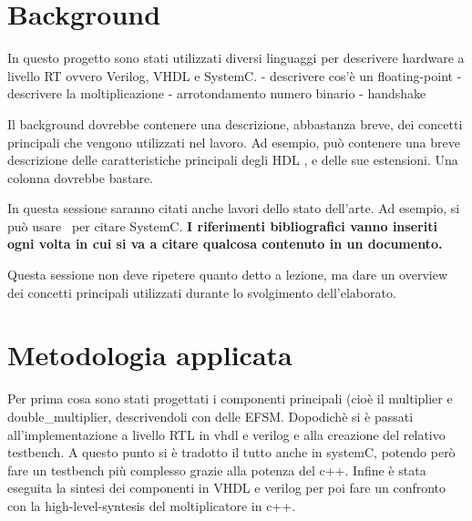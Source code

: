 \documentclass[]{IEEEtran}
\begin{document}
\section{Background}
In questo progetto sono stati utilizzati diversi linguaggi per descrivere hardware a livello RT ovvero Verilog, VHDL e SystemC.
- descrivere cos'è un floating-point
- descrivere la moltiplicazione
- arrotondamento numero binario
- handshake

Il background dovrebbe contenere una descrizione, abbastanza breve, dei concetti principali che vengono utilizzati nel lavoro. Ad esempio, può contenere una breve descrizione delle caratteristiche principali degli HDL , e delle sue estensioni. Una colonna dovrebbe bastare.

In questa sessione saranno citati anche lavori dello stato dell'arte. Ad esempio, si può usare~\cite{SystemC} per citare SystemC. \textbf{I riferimenti bibliografici vanno inseriti ogni volta in cui si va a citare qualcosa contenuto in un documento.}

Questa sessione non deve ripetere quanto detto a lezione, ma dare un overview dei concetti principali utilizzati durante lo svolgimento dell'elaborato.


\section{Metodologia applicata}
Per prima cosa sono stati progettati i componenti principali (cioè il multiplier e double\_multiplier, descrivendoli con delle EFSM. Dopodichè si è passati all'implementazione a livello RTL in vhdl e verilog e alla creazione del relativo testbench. A questo punto si è tradotto il tutto anche in systemC, potendo però fare un testbench più complesso grazie alla potenza del c++. Infine è stata eseguita la sintesi dei componenti in VHDL e verilog per poi fare un confronto con la high-level-syntesis del moltiplicatore in c++.
\end{document}
